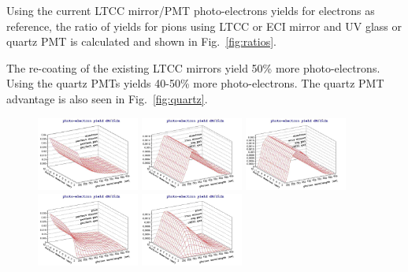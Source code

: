 \documentclass{article}
\begin{document}
Using the current LTCC mirror/PMT photo-electrons yields for electrons as reference, the ratio of yields for pions
using LTCC or ECI mirror and UV glass or quartz PMT is calculated and shown in Fig.~\ref{fig:ratios}.

The re-coating of the existing LTCC mirrors yield 50\% more photo-electrons. Using the quartz PMTs yields 40-50\% more
photo-electrons. The quartz PMT advantage is also  seen in Fig.~\ref{fig:quartz}.  
\vspace{1cm}
\begin{figure}[h]
	\centering
	\includegraphics[width=0.3\textwidth]{img/photon_yield_spectrum_electron_gasperfect_mirrorperfect_pmtperfect.jpg}
	\includegraphics[width=0.3\textwidth]{img/photon_yield_spectrum_electron_gasc4f10_mirrorltcc_pmtuvg.jpg}
	\includegraphics[width=0.3\textwidth]{img/photon_yield_spectrum_electron_gasc4f10_mirrorecis_pmtuvg.jpg}
	\includegraphics[width=0.3\textwidth]{img/photon_yield_spectrum_pion_gasperfect_mirrorperfect_pmtperfect.jpg}
	\includegraphics[width=0.3\textwidth]{img/photon_yield_spectrum_pion_gasc4f10_mirrorltcc_pmtuvg.jpg}

\end{figure}
\end{document}
